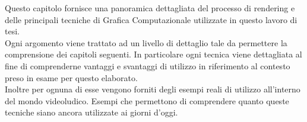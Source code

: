 Questo capitolo fornisce una panoramica dettagliata del processo di rendering e delle principali tecniche di Grafica Computazionale utilizzate in questo lavoro di tesi.
\\
Ogni argomento viene trattato ad un livello di dettaglio tale da permettere la comprensione dei capitoli seguenti. 
In particolare ogni tecnica viene dettagliata al fine di comprenderne vantaggi e svantaggi di utilizzo in riferimento al contesto preso in esame per questo elaborato.
\\
Inoltre per ognuna di esse vengono forniti degli esempi reali di utilizzo all'interno del mondo videoludico. Esempi che permettono di comprendere quanto queste tecniche siano ancora utilizzate ai giorni d'oggi.
